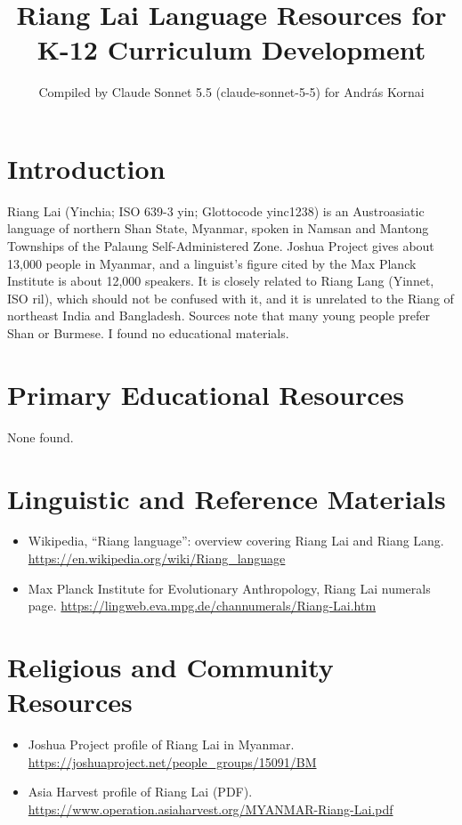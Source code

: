 \documentclass[12pt]{article}
\title{Riang Lai Language Resources for K-12 Curriculum Development}
\author{Compiled by Claude Sonnet 5.5 (claude-sonnet-5-5) for Andr\'as Kornai}
\date{}
\begin{document}
\maketitle

\section{Introduction}
Riang Lai (Yinchia; ISO 639-3 yin; Glottocode yinc1238) is an Austroasiatic language of northern Shan State, Myanmar, spoken in Namsan and Mantong Townships of the Palaung Self-Administered Zone. Joshua Project gives about 13,000 people in Myanmar, and a linguist's figure cited by the Max Planck Institute is about 12,000 speakers. It is closely related to Riang Lang (Yinnet, ISO ril), which should not be confused with it, and it is unrelated to the Riang of northeast India and Bangladesh. Sources note that many young people prefer Shan or Burmese. I found no educational materials.

\section{Primary Educational Resources}
None found.

\section{Linguistic and Reference Materials}
\begin{itemize}
\item Wikipedia, ``Riang language'': overview covering Riang Lai and Riang Lang. \url{https://en.wikipedia.org/wiki/Riang_language}
\item Max Planck Institute for Evolutionary Anthropology, Riang Lai numerals page. \url{https://lingweb.eva.mpg.de/channumerals/Riang-Lai.htm}
\end{itemize}

\section{Religious and Community Resources}
\begin{itemize}
\item Joshua Project profile of Riang Lai in Myanmar. \url{https://joshuaproject.net/people_groups/15091/BM}
\item Asia Harvest profile of Riang Lai (PDF). \url{https://www.operation.asiaharvest.org/MYANMAR-Riang-Lai.pdf}
\end{itemize}
\end{document}
